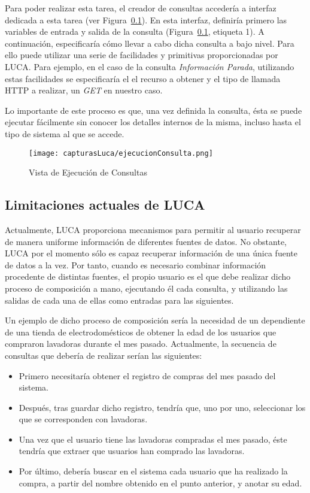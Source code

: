 Para poder realizar esta tarea, el creador de consultas accedería a interfaz dedicada a esta tarea (ver Figura~\ref{}). En esta interfaz, definiría primero las variables de entrada y salida de la consulta (Figura~\ref{}, etiqueta 1). A continuación, especificaría cómo llevar a cabo dicha consulta a bajo nivel. Para ello puede utilizar una serie de facilidades y primitivas proporcionadas por LUCA. Para ejemplo, en el caso de la consulta \emph{Información Parada}, utilizando estas facilidades se especificaría el el recurso a obtener y el tipo de llamada HTTP a realizar, un \emph{GET} en nuestro caso.

Lo importante de este proceso es que, una vez definida la consulta, ésta se puede ejecutar fácilmente sin conocer los detalles internos de la misma, incluso hasta el tipo de sistema al que se accede.


	\begin{figure}[H]
		\centering
		\texttt{[image: capturasLuca/ejecucionConsulta.png]}
		\caption{Vista de Ejecución de Consultas}\label{fig:ejecucionConsultas}
	\end{figure}

\subsection{Limitaciones actuales de LUCA}

Actualmente, LUCA proporciona mecanismos para permitir al usuario recuperar de manera uniforme información de diferentes fuentes de datos. No obstante, LUCA por el momento sólo es capaz recuperar información de una única fuente de datos a la vez. Por tanto, cuando es necesario combinar información procedente de distintas fuentes, el propio usuario es el que debe realizar dicho proceso de composición a mano, ejecutando él cada consulta, y utilizando las salidas de cada una de ellas como entradas para las siguientes.


Un ejemplo de dicho proceso de composición sería la necesidad de un dependiente de una tienda de electrodomésticos de obtener la edad de los usuarios que compraron lavadoras durante el mes pasado. Actualmente, la secuencia de consultas que debería de realizar serían las siguientes:

\begin{itemize}
	\item Primero necesitaría obtener el registro de compras del mes pasado del sistema.
	\item Después, tras guardar dicho registro, tendría que, uno por uno, seleccionar los que se corresponden con lavadoras.
	\item Una vez que el usuario tiene las lavadoras compradas el mes pasado, éste tendría que extraer que usuarios han comprado las lavadoras.
	\item Por último, debería buscar en el sistema cada usuario que ha realizado la compra, a partir del nombre obtenido en el punto anterior, y anotar su edad.
\end{itemize}

